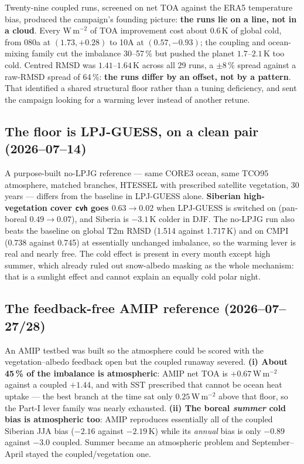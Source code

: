 \documentclass[10pt]{article}
\begin{document}
Twenty-nine coupled runs, screened on net TOA against the ERA5 temperature bias, produced
the campaign's founding picture: \textbf{the runs lie on a line, not in a cloud}. Every
W\,m$^{-2}$ of TOA improvement cost about $0.6$\,K of global cold, from 080a at
$(1.73,+0.28)$ to 10A at $(0.57,-0.93)$; the coupling and ocean-mixing family cut the
imbalance 30--57\,\% but pushed the planet $1.7$--$2.1$\,K too cold. Centred RMSD was
$1.41$--$1.64$\,K across all 29 runs, a $\pm8\,\%$ spread against a raw-RMSD spread of
64\,\%: \textbf{the runs differ by an offset, not by a pattern}. That identified a shared
structural floor rather than a tuning deficiency, and sent the campaign looking for a
warming lever instead of another retune.

\subsection{The floor is LPJ-GUESS, on a clean pair (2026--07--14)}

A purpose-built no-LPJG reference --- same CORE3 ocean, same TCO95 atmosphere, matched
branches, HTESSEL with prescribed satellite vegetation, 30 years --- differs from the
baseline in LPJ-GUESS alone. \textbf{Siberian high-vegetation cover \texttt{cvh} goes
$0.63\to0.02$} when LPJ-GUESS is switched on (pan-boreal $0.49\to0.07$), and Siberia is
$-3.1$\,K colder in DJF. The no-LPJG run also beats the baseline on global T2m RMSD (1.514
against 1.717\,K) and on CMPI (0.738 against 0.745) at essentially unchanged imbalance, so
the warming lever is real and nearly free. The cold effect is present in every month except
high summer, which already ruled out snow-albedo masking as the whole mechanism: that is a
sunlight effect and cannot explain an equally cold polar night.

\subsection{The feedback-free AMIP reference (2026--07--27/28)}

An AMIP testbed was built so the atmosphere could be scored with the vegetation--albedo
feedback open but the coupled runaway severed. \textbf{(i) About 45\,\% of the imbalance is
atmospheric}: AMIP net TOA is $+0.67$\,W\,m$^{-2}$ against a coupled $+1.44$, and with SST
prescribed that cannot be ocean heat uptake --- the best branch at the time sat only
$0.25$\,W\,m$^{-2}$ above that floor, so the Part-I lever family was nearly exhausted.
\textbf{(ii) The boreal \emph{summer} cold bias is atmospheric too}: AMIP reproduces
essentially all of the coupled Siberian JJA bias ($-2.16$ against $-2.19$\,K) while its
\emph{annual} bias is only $-0.89$ against $-3.0$ coupled. Summer became an atmospheric
problem and September--April stayed the coupled/vegetation one.
\end{document}
